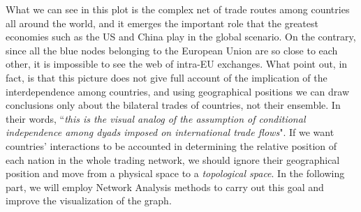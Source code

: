What we can see in this plot is the complex net of trade routes among countries all around the world, and it emerges the important role that the greatest economies such as the US and China play in the global scenario. On the contrary, since all the blue nodes belonging to the European Union are so close to each other, it is impossible to see the web of intra-EU exchanges. What \textcite{benedictis2014bacicepii} point out, in fact, is that this picture does not give full account of the implication of the interdependence among countries, and using geographical positions we can draw conclusions only about the bilateral trades of countries, not their ensemble. In their words, ``\textit{this is the visual analog of the assumption of conditional independence among dyads imposed on international trade flows}".
If we want countries' interactions to be accounted in determining the relative position of each nation in the whole trading network, we should ignore their geographical position and move from a physical space to a \textit{topological space}. In the following part, we will employ Network Analysis methods to carry out this goal and improve the visualization of the graph.

